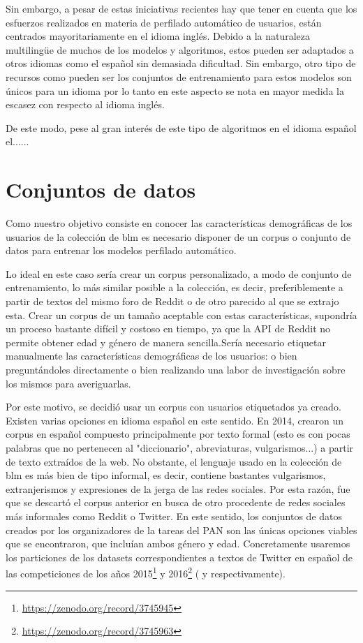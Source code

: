 Sin embargo, a pesar de estas iniciativas recientes hay que tener en cuenta que los esfuerzos realizados en materia de perfilado automático de usuarios, están centrados mayoritariamente en el idioma inglés. Debido a la naturaleza multilingüe de muchos de los modelos y algoritmos, estos pueden ser adaptados a otros idiomas como el español sin demasiada dificultad. Sin embargo, otro tipo de recursos como pueden ser los conjuntos de entrenamiento para estos modelos son únicos para un idioma por lo tanto en este aspecto se nota en mayor medida la escasez con respecto al idioma inglés.

De este modo, pese al gran interés de este tipo de algoritmos en el idioma español el......
\section{Conjuntos de datos}
\label{sec:datasets}
Como nuestro objetivo consiste en conocer las características demográficas de los usuarios de la colección de \acrshort{blm} es necesario disponer de un corpus o conjunto de datos para entrenar los modelos perfilado automático.

Lo ideal en este caso sería crear un corpus personalizado, a modo de conjunto de entrenamiento, lo más similar posible a la colección, es decir, preferiblemente a partir de textos del mismo foro de Reddit o de otro parecido al que se extrajo esta. Crear un corpus de un tamaño aceptable con estas características, supondría un proceso bastante difícil y costoso en tiempo, ya que la API de Reddit no permite obtener edad y género de manera sencilla.Sería necesario etiquetar manualmente las características demográficas de los usuarios: o bien preguntándoles directamente o bien realizando una labor de investigación sobre los mismos para averiguarlas.

Por este motivo, se decidió usar un corpus con usuarios etiquetados ya creado. Existen varias opciones en idioma español en este sentido. En 2014, \cite{SpanText} crearon un corpus en español compuesto principalmente por texto formal (esto es con pocas palabras que no pertenecen al "diccionario", abreviaturas, vulgarismos...) a partir de texto extraídos de la web. No obstante, el lenguaje usado en la colección de \acrshort{blm} es más bien de tipo informal, es decir, contiene bastantes vulgarismos, extranjerismos 
 y expresiones de la jerga de las redes sociales. Por esta razón, fue que se descartó el corpus anterior en busca de otro procedente de redes sociales más informales como Reddit o Twitter. En este sentido, los conjuntos de datos creados por los organizadores de la tareas del PAN son las únicas opciones viables que se encontraron, que incluían ambos género y edad. Concretamente usaremos los particiones de los \gls{datasets} correspondientes a textos de Twitter en español de las competiciones de los años 2015\footnote{\url{https://zenodo.org/record/3745945}} y 2016\footnote{\url{https://zenodo.org/record/3745963}} (\cite{pan:2015} y \cite{pan:2016} respectivamente).
 
